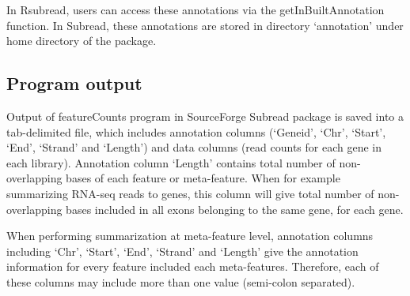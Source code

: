 \documentclass[12pt]{report}
\newcommand{\Subread}{\textsf{Subread}}
\newcommand{\Rsubread}{\textsf{Rsubread}}
\newcommand{\featureCounts}{\textsf{featureCounts}}
\begin{document}
In {\Rsubread}, users can access these annotations via the {\textsf{getInBuiltAnnotation}} function.
In {\Subread}, these annotations are stored in directory `annotation' under home directory of the package.

\subsection{Program output}

Output of {\featureCounts} program in SourceForge {\Subread} package is saved into a tab-delimited file, which includes annotation columns (`Geneid', `Chr', `Start', `End', `Strand' and `Length') and data columns (read counts for each gene in each library).
Annotation column `Length' contains total number of non-overlapping bases of each feature or meta-feature.
When for example summarizing RNA-seq reads to genes, this column will give total number of non-overlapping bases included in all exons belonging to the same gene, for each gene.

When performing summarization at meta-feature level, annotation columns including `Chr', `Start', `End', `Strand' and `Length' give the annotation information for every feature included each meta-features.
Therefore, each of these columns may include more than one value (semi-colon separated).
\end{document}
